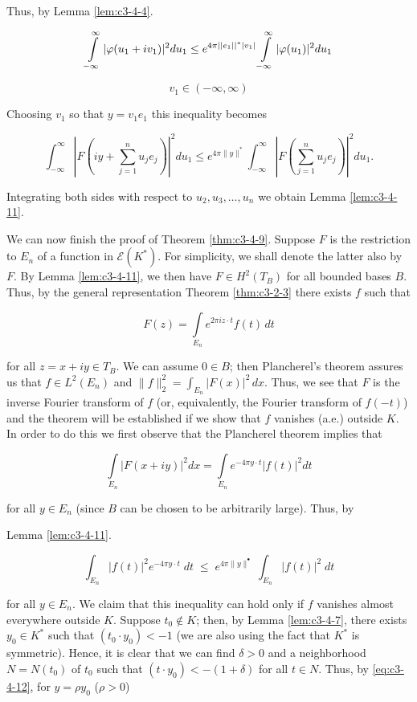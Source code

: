 Thus, by Lemma \ref{lem:c3-4-4}.

\[
\intop_{-\infty}^{\infty}|\varphi(u_{1}+i v_{1})|^{2}d u_{1}\leq e^{4\pi||e_{1}||^{*}|v_{1}|}\intop_{-\infty}^{\infty}|\varphi(u_{1})|^{2}d u_{1}
\]

\[
v_{1}\in(-\infty,\infty)
\]

Choosing $v_{1}$ so that $y = v_{1}e_{1}$ this inequality becomes

\[
\int_{-\infty}^{\infty}\left|F\left(i y+\sum_{j=1}^{n}u_{j}e_{j}\right)\right|^{2}d u_{1}\leq e^{4\pi\|y\|^{*}}\int_{-\infty}^{\infty}\left|F\left(\sum_{j=1}^{n}u_{j}e_{j}\right)\right|^{2}d u_{1}.
\]

Integrating both sides with respect to $u_{2}, u_{3}, \ldots, u_{n}$ we obtain Lemma \ref{lem:c3-4-11}.

We can now finish the proof of Theorem \ref{thm:c3-4-9}. Suppose $F$ is the restriction to $E_n$ of a function in $\mathcal{E}(K^*)$. For simplicity, we shall denote the latter also by $F$. By Lemma \ref{lem:c3-4-11}, we then have $F \in H^2(T_B)$ for all bounded bases $B$. Thus, by the general representation Theorem \ref{thm:c3-2-3} there exists $f$ such that

\[
F(z)=\int\limits_{E_{n}}e^{2\pi i z\cdot t}f(t)\,dt
\]

for all $z = x + iy \in T_B$. We can assume $0 \in B$; then Plancherel's theorem assures us that $f \in L^2(E_n)$ and $\|f\|_2^2 = \int_{E_n} |F(x)|^2 \, dx$. Thus, we see that $F$ is the inverse Fourier transform of $f$ (or, equivalently, the Fourier transform of $f(-t)$) and the theorem will be established if we show that $f$ vanishes (a.e.) outside $K$. In order to do this we first observe that the Plancherel theorem implies that

\[
\int\limits_{E_{n}}|F(x+i y)|^{2}d x=\int\limits_{E_{n}}e^{-4\pi y\cdot t}|f(t)|^{2}d t
\]

for all $y \in E_n$ (since $B$ can be chosen to be arbitrarily large). Thus, by

Lemma \ref{lem:c3-4-11}.

\begin{equation}\label{eq:c3-4-12}
\int_{E_{n}}|f(t)|^{2}e^{-4\pi y\cdot t}\;d t\;\leq\;e^{4\pi\|y\|^{\bullet}}\;\int_{E_{n}}|f(t)|^{2}\;d t
\end{equation}

for all $y \in E_n$. We claim that this inequality can hold only if $f$ vanishes almost everywhere outside $K$. Suppose $t_0 \notin K$; then, by Lemma \ref{lem:c3-4-7}, there exists $y_0 \in K^*$ such that $(t_0 \cdot y_0) < -1$ (we are also using the fact that $K^*$ is symmetric). Hence, it is clear that we can find $\delta > 0$ and a neighborhood $N = N(t_0)$ of $t_0$ such that $(t \cdot y_0) < -(1 + \delta)$ for all $t \in N$. Thus, by \eqref{eq:c3-4-12}, for $y = \rho y_0$ ($\rho > 0$)

